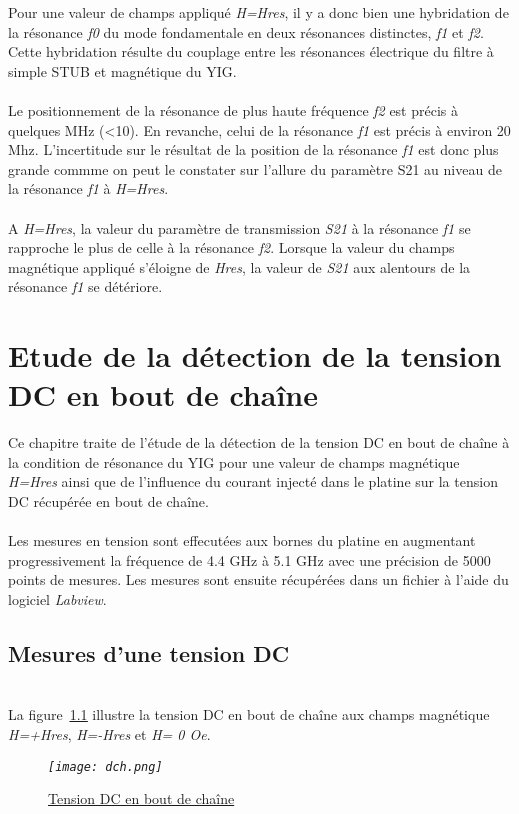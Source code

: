 \documentclass[12pt,fleqn]{book} %
\begin{document}
\noindent Pour une valeur de champs appliqué \emph{H=Hres}, il y a donc bien une hybridation de la résonance \emph{f0} du mode fondamentale en deux résonances distinctes, \emph{f1} et \emph{f2}. Cette hybridation résulte du couplage entre les résonances électrique du filtre à simple STUB et magnétique du YIG.
~\\\\ Le positionnement de la résonance de plus haute fréquence \emph{f2} est précis à quelques MHz (<10). En revanche, celui de la résonance \emph{f1} est précis à environ 20 Mhz. L'incertitude sur le résultat de la position de la résonance \emph{f1} est donc plus grande commme on peut le constater sur l'allure du paramètre S21 au niveau de la résonance \emph{f1} à \emph{H=Hres}.
~\\\\ A \emph{H=Hres}, la valeur du paramètre de transmission \emph{S21} à la résonance \emph{f1} se rapproche le plus de celle à la résonance \emph{f2}. Lorsque la valeur du champs magnétique appliqué s'éloigne de \emph{Hres}, la valeur de \emph{S21} aux alentours de la résonance \emph{f1} se détériore.
\chapter{Etude de la détection de la tension DC en bout de chaîne}
Ce chapitre traite de l'étude de la détection de la tension DC en bout de chaîne à la condition de résonance du YIG pour une valeur de champs magnétique \emph{H=Hres} ainsi que de l'influence du courant injecté dans le platine sur la tension DC récupérée en bout de chaîne.
~\\\\ Les mesures en tension sont effecutées aux bornes du platine en augmentant progressivement la fréquence de 4.4 GHz à 5.1 GHz avec une précision de 5000 points de mesures. Les mesures sont ensuite récupérées dans un fichier à l'aide du logiciel \emph{Labview}.
\section{Mesures d'une tension DC}
~\\\noindent La figure~\underline{\color{blue}\ref{dch}} illustre la tension DC en bout de chaîne aux champs magnétique \emph{H=+Hres}, \emph{H=-Hres} et \emph{H= 0 Oe}.
\begin{figure}[H]
	\centering
	\itshape
	\texttt{[image: dch.png]}
	\caption{\label{dch} \underline{Tension DC en bout de chaîne}}
\end{figure}
\end{document}
